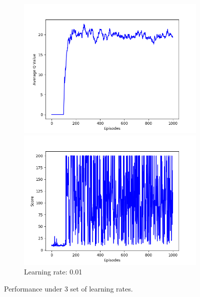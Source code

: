 \documentclass{article}
\begin{document}
\begin{figure}[!htbp]
  \begin{subfigure}{\textwidth}
    \begin{minipage}{0.5\textwidth}
      \centering
      \includegraphics[scale=0.45]{../experiments/lr_1E-2/qvalues.png}
    \end{minipage}
    \begin{minipage}{0.5\textwidth}
      \centering
      \includegraphics[scale=0.45]{../experiments/lr_1E-2/scores.png}
    \end{minipage}
    \caption{Learning rate: 0.01}
  \end{subfigure}%
  \caption{Performance under 3 set of learning rates.}
  \label{learning rate}
\end{figure}
\end{document}
